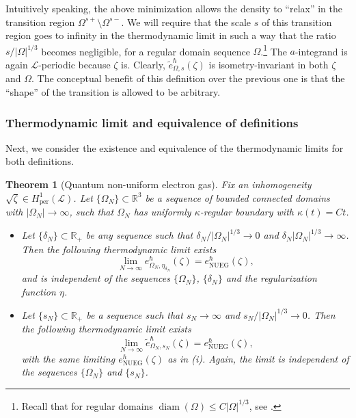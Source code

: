 \documentclass[final,onefignum,onetabnum,reqno]{amsart}
\newtheorem{theorem}{Theorem}[section]
\theoremstyle{remark}
\renewcommand{\le}{\leqslant}
\newcommand{\wt}[1]{\widetilde{#1}}
\DeclareMathOperator{\diam}{diam}
\newcommand{\RR}{\mathbb{R}}
\newcommand{\per}{\mathrm{per}} %
\newcommand{\NUEG}{\mathrm{NUEG}} %
\newcommand{\LC}{\mathcal{L}}
\begin{document}
Intuitively speaking, the above minimization allows the density to ``relax'' in the transition region $\Omega^{s+}\setminus\Omega^{s-}$. We will require that the scale $s$ of this transition region goes to infinity in the thermodynamic limit in such a way that the ratio $s/|\Omega|^{1/3}$ becomes negligible, for a regular domain sequence $\Omega$.\footnote{Recall that for regular domains $\diam(\Omega)\le C|\Omega|^{1/3}$, see \cite{fisher1964free}.} 
The $a$-integrand is again $\LC$-periodic because $\zeta$ is.
Clearly, $\wt{e}_{\Omega,s}^\hbar(\zeta)$ is isometry-invariant in both $\zeta$ and $\Omega$. 
The conceptual benefit of this definition over the previous one is that the ``shape'' of the
transition is allowed to be arbitrary. 

\subsubsection{Thermodynamic limit and equivalence of definitions}
Next, we consider the existence and equivalence of the thermodynamic limits for both definitions.

\begin{theorem}[Quantum non-uniform electron gas]\label{thermolimthm}
Fix an inhomogeneity $\sqrt{\zeta}\in H^1_\per(\LC)$.
Let $\{\Omega_N\}\subset\RR^3$ be a sequence of bounded connected domains with $|\Omega_N|\to\infty$, such that $\Omega_N$ has uniformly $\kappa$-regular boundary with $\kappa(t)=Ct$. 
\begin{itemize}
\item[(i)] Let $\{\delta_N\}\subset\RR_+$ be any sequence such that $\delta_N/|\Omega_N|^{1/3}\to 0$ and $\delta_N|\Omega_N|^{1/3}\to\infty$.
Then the following thermodynamic limit exists
\begin{equation}\label{nueglim}
\lim_{N\to\infty} e^\hbar_{\Omega_N,\eta_{\delta_N}}(\zeta)=e_\NUEG^\hbar(\zeta),
\end{equation}
and is independent of the sequences $\{\Omega_N\}$, $\{\delta_N\}$ and the regularization function $\eta$. 
\item[(ii)] Let $\{s_N\}\subset\RR_+$ be a sequence such that $s_N\to\infty$ and $s_N/|\Omega_N|^{1/3}\to 0$. Then the following thermodynamic limit exists
\begin{equation}\label{thlimtr}
\lim_{N\to\infty} \wt{e}_{\Omega_N,s_N}^\hbar(\zeta)=e_\NUEG^\hbar(\zeta),
\end{equation}
with the same limiting $e_\NUEG^\hbar(\zeta)$ as in (i). Again, the limit is independent of the sequences $\{\Omega_N\}$ and $\{s_N\}$.
\end{itemize}
\end{theorem}
\end{document}
